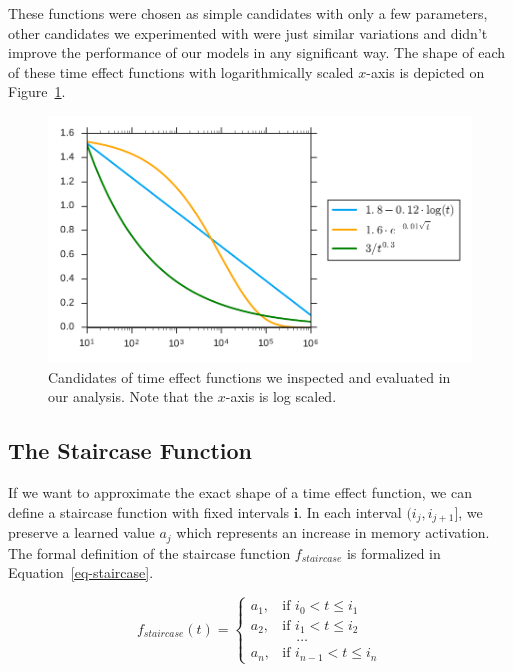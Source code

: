 These functions were chosen as simple candidates with only a few parameters, other candidates we experimented with were just similar variations and didn't improve the performance of our models in any significant way. The shape of each of these time effect functions with logarithmically scaled $x$-axis is depicted on Figure~\ref{fig-time-effect-functions}.

\begin{figure}[htbp]
  \centering
  \includegraphics[width=\textwidth]{img/time-effect-functions}
  \caption{Candidates of time effect functions we inspected and evaluated in our analysis. Note that the $x$-axis is log scaled.}
  \label{fig-time-effect-functions}
\end{figure}

\subsection{The Staircase Function}
\label{staircase-function}

If we want to approximate the exact shape of a time effect function, we can define a staircase function with fixed intervals $\mathbf{i}$. In each interval $(i_j, i_{j+1}]$, we preserve a learned value $a_j$ which represents an increase in memory activation. The formal definition of the staircase function $f_{\mathit{staircase}}$ is formalized in Equation~\ref{eq-staircase}.

\begin{equation} \label{eq-staircase}
  f_{\mathit{staircase}}(t) = \begin{cases}
            a_1, & \text{if } i_0 < t \leq i_1 \\
            a_2, & \text{if } i_1 < t \leq i_2 \\
                 & \hspace{1em} \dots \\
            a_n, & \text{if } i_{n-1} < t \leq i_n
         \end{cases}
\end{equation}

